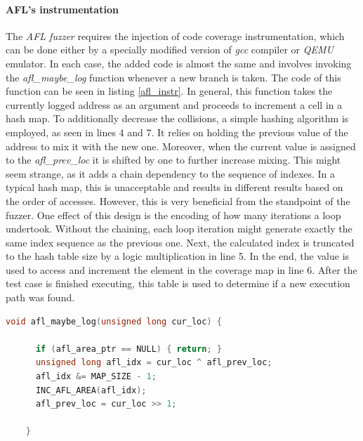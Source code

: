 \paragraph{AFL's instrumentation} \label{sec:aflinstr}
The \textit{AFL fuzzer} requires the injection of code coverage instrumentation, which can be done either by a specially modified version of \textit{gcc} compiler or \textit{QEMU} emulator. In each case, the added code is almost the same and involves invoking the \textit{afl\_maybe\_log} function whenever a new branch is taken. The code of this function can be seen in listing \ref{afl_instr}. In general, this function takes the currently logged address as an argument and proceeds to increment a cell in a hash map. To additionally decrease the collisions, a simple hashing algorithm is employed, as seen in lines 4 and 7. It relies on holding the previous value of the address to mix it with the new one. Moreover, when the current value is assigned to the \textit{afl\_prev\_loc} it is shifted by one to further increase mixing. This might seem strange, as it adds a chain dependency to the sequence of indexes. In a typical hash map, this is unacceptable and results in different results based on the order of accesses. However, this is very beneficial from the standpoint of the fuzzer. One effect of this design is the encoding of how many iterations a loop undertook. Without the chaining, each loop iteration might generate exactly the same index sequence as the previous one. Next, the calculated index is truncated to the hash table size by a logic multiplication in line 5. In the end, the value is used to access and increment the element in the coverage map in line 6. After the test case is finished executing, this table is used to determine if a new execution path was found.

\begin{minipage}\linewidth
    \begin{lstlisting}[language=C,caption={Instrumentation code from AFLPlusPlus fuzzer from \cite{aflpprepo}.},captionpos=b,label={afl_instr}]
    void afl_maybe_log(unsigned long cur_loc) {
    
      if (afl_area_ptr == NULL) { return; }
      unsigned long afl_idx = cur_loc ^ afl_prev_loc;
      afl_idx &= MAP_SIZE - 1;
      INC_AFL_AREA(afl_idx);
      afl_prev_loc = cur_loc >> 1;
    
    }
    \end{lstlisting}
\end{minipage}

